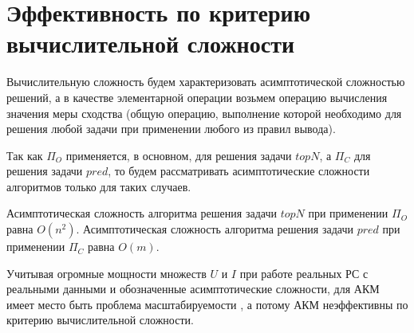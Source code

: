%
%
%

\section{Эффективность по критерию вычислительной сложности}
Вычислительную сложность будем характеризовать асимптотической сложностью
решений, а в качестве элементарной операции возьмем операцию вычисления
значения меры сходства (общую операцию, выполнение которой необходимо для
решения любой задачи при применении любого из правил вывода).

Так как $\Pi_O$ применяется, в основном, для решения задачи $topN$, а
$\Pi_C$ для решения задачи $pred$, то будем рассматривать
асимптотические сложности алгоритмов только для таких случаев.

Асимптотическая сложность алгоритма решения задачи $topN$ при применении
$\Pi_O$ равна $O(n^2)$.
Асимптотическая сложность алгоритма решения задачи $pred$ при применении
$\Pi_C$ равна $O(m)$.

Учитывая огромные мощности множеств $U$ и $I$ при работе реальных РС
с реальными данными и обозначенные асимптотические сложности, для АКМ
имеет место быть проблема масштабируемости \cite{amazon-item2item}, а потому АКМ неэффективны по
критерию вычислительной сложности.

